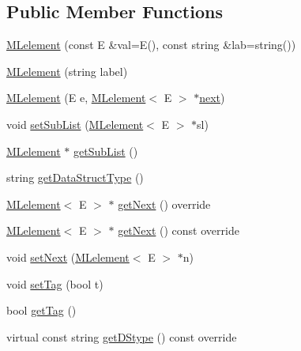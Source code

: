 \subsection*{Public Member Functions}
\begin{DoxyCompactItemize}
\item 
\mbox{\hyperlink{classbridges_1_1_m_lelement_a5d0e64b99abf4d1ad1d2cc89ca28343c}{M\+Lelement}} (const E \&val=E(), const string \&lab=string())
\item 
\mbox{\hyperlink{classbridges_1_1_m_lelement_ade42b08d96030f1ed5b92c5613d5cedd}{M\+Lelement}} (string label)
\item 
\mbox{\hyperlink{classbridges_1_1_m_lelement_aaab4924754f94138bb110efd4c047411}{M\+Lelement}} (E e, \mbox{\hyperlink{classbridges_1_1_m_lelement}{M\+Lelement}}$<$ E $>$ $\ast$\mbox{\hyperlink{classbridges_1_1_s_lelement_ad7449d10a09ebc52653a7baed812aa43}{next}})
\item 
void \mbox{\hyperlink{classbridges_1_1_m_lelement_ad436f6424e7542ac92df93509f16c7e7}{set\+Sub\+List}} (\mbox{\hyperlink{classbridges_1_1_m_lelement}{M\+Lelement}}$<$ E $>$ $\ast$sl)
\item 
\mbox{\hyperlink{classbridges_1_1_m_lelement}{M\+Lelement}} $\ast$ \mbox{\hyperlink{classbridges_1_1_m_lelement_a55f82b59284e22caef23959e023614cc}{get\+Sub\+List}} ()
\item 
string \mbox{\hyperlink{classbridges_1_1_m_lelement_a49e5d132e80531f005e1d2da666f0c39}{get\+Data\+Struct\+Type}} ()
\item 
\mbox{\hyperlink{classbridges_1_1_m_lelement}{M\+Lelement}}$<$ E $>$ $\ast$ \mbox{\hyperlink{classbridges_1_1_m_lelement_aceebd292e7d497f44eea5c4845e7709f}{get\+Next}} () override
\item 
\mbox{\hyperlink{classbridges_1_1_m_lelement}{M\+Lelement}}$<$ E $>$ $\ast$ \mbox{\hyperlink{classbridges_1_1_m_lelement_aef3e5750e334331597bce94710745d1e}{get\+Next}} () const override
\item 
void \mbox{\hyperlink{classbridges_1_1_m_lelement_aec9747cee60fcafbe474709a9dad21dc}{set\+Next}} (\mbox{\hyperlink{classbridges_1_1_m_lelement}{M\+Lelement}}$<$ E $>$ $\ast$n)
\item 
void \mbox{\hyperlink{classbridges_1_1_m_lelement_a525e43688c15f38382b2d471e1b8d39f}{set\+Tag}} (bool t)
\item 
bool \mbox{\hyperlink{classbridges_1_1_m_lelement_a7ac084867fd83d7742f0a305e44e523a}{get\+Tag}} ()
\item 
virtual const string \mbox{\hyperlink{classbridges_1_1_m_lelement_af6e8a50c38e6481ce2c569d0174c564e}{get\+D\+Stype}} () const override
\end{DoxyCompactItemize}
